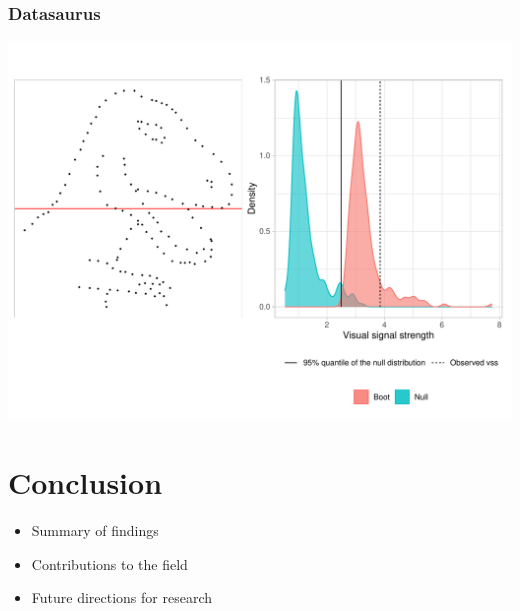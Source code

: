 \documentclass[]{interact}
\theoremstyle{plain}%
\theoremstyle{definition}
\theoremstyle{remark}
\providecommand{\tightlist}{%
  \setlength{\itemsep}{0pt}\setlength{\parskip}{0pt}}
\def\tightlist{}
\begin{document}
\hypertarget{datasaurus}{%
\subsubsection{Datasaurus}\label{datasaurus}}

\begin{center}\includegraphics[width=1\linewidth]{paper_files/figure-latex/unnamed-chunk-20-1} \end{center}

\hypertarget{conclusion}{%
\section{Conclusion}\label{conclusion}}

\begin{itemize}
\tightlist
\item
  Summary of findings
\item
  Contributions to the field
\item
  Future directions for research
\end{itemize}



\end{document}
